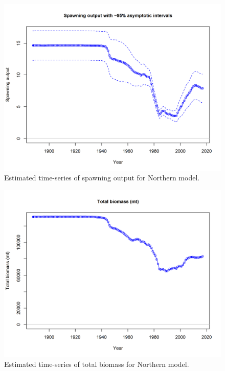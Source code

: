 \documentclass[12pt,]{article}
\begin{document}
\begin{figure}[htbp]
\centering
\includegraphics{r4ss/plots_mod1/ts7_Spawning_output_with_95_asymptotic_intervals_intervals.png}
\caption{Estimated time-series of spawning output for Northern model.
\label{fig:ssb.N}}
\end{figure}

\FloatBarrier

\begin{figure}[htbp]
\centering
\includegraphics{r4ss/plots_mod1/ts1_Total_biomass_(mt).png}
\caption{Estimated time-series of total biomass for Northern model.
\label{fig:total_bio.N}}
\end{figure}
\end{document}
